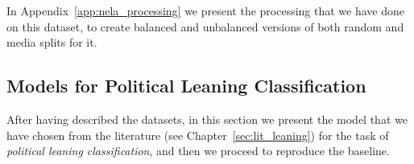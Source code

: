 In Appendix~\ref{app:nela_processing} we present the processing that we have done on this dataset, to create balanced and unbalanced versions of both random and media splits for it.

\subsection{\statusgreen Models for Political Leaning Classification}
\label{ssec:ps_leaning_models}




After having described the datasets, in this section we present the model that we have chosen from the literature (see Chapter~\ref{sec:lit_leaning}) for the task of \emph{political leaning classification}, and then we proceed to reproduce the baseline.






